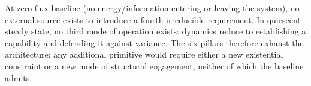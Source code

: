 At zero flux baseline (no energy/information entering or leaving the system), no external source exists to introduce a fourth irreducible requirement. In quiescent steady state, no third mode of operation exists: dynamics reduce to establishing a capability and defending it against variance. The six pillars therefore exhaust the architecture; any additional primitive would require either a new existential constraint or a new mode of structural engagement, neither of which the baseline admits.